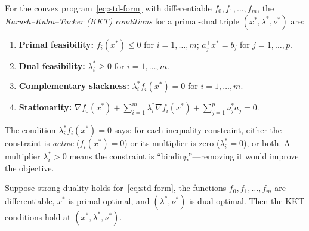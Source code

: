\documentclass[11pt,a4paper]{article}
\begin{document}
\begin{definition}\label{def:kkt}
For the convex program~\eqref{eq:std-form} with differentiable
$f_0, f_1, \dots, f_m$, the \emph{Karush--Kuhn--Tucker (KKT) conditions}
for a primal-dual triple $(x^*, \lambda^*, \nu^*)$ are:
\begin{enumerate}[label=\textbf{(KKT\arabic*)}]
  \item \textbf{Primal feasibility:}\label{kkt:primal}
    $f_i(x^*) \le 0$ for $i = 1,\dots,m$; \;
    $a_j^\top x^* = b_j$ for $j = 1,\dots,p$.
  \item \textbf{Dual feasibility:}\label{kkt:dual}
    $\lambda^*_i \ge 0$ for $i = 1,\dots,m$.
  \item \textbf{Complementary slackness:}\label{kkt:cs}
    $\lambda^*_i f_i(x^*) = 0$ for $i = 1,\dots,m$.
  \item \textbf{Stationarity:}\label{kkt:stat}
    $\displaystyle \nabla f_0(x^*) + \sum_{i=1}^m \lambda^*_i \nabla f_i(x^*)
     + \sum_{j=1}^p \nu^*_j a_j = 0$.
\end{enumerate}
\end{definition}

\begin{remark}\label{rem:cs}
The condition $\lambda^*_i f_i(x^*) = 0$ says: for each inequality constraint,
either the constraint is \emph{active} ($f_i(x^*) = 0$) or its multiplier is
zero ($\lambda^*_i = 0$), or both. A multiplier $\lambda^*_i > 0$ means the
constraint is ``binding''---removing it would improve the objective.
\end{remark}

\begin{theorem}\label{thm:kkt-necessary}
Suppose strong duality holds for~\eqref{eq:std-form}, the functions
$f_0, f_1, \dots, f_m$ are differentiable, $x^*$ is primal optimal, and
$(\lambda^*, \nu^*)$ is dual optimal. Then the KKT conditions hold at
$(x^*, \lambda^*, \nu^*)$.
\end{theorem}
\end{document}
